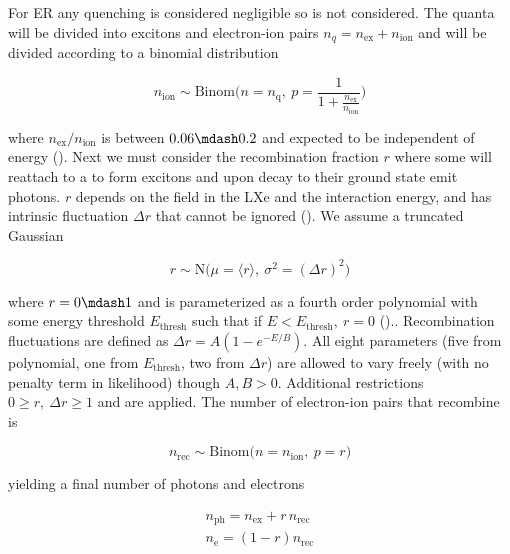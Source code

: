 For ER any quenching is considered negligible so is not considered.  The quanta will be divided into excitons and electron-ion pairs
$n_q = n_{\mathrm{ex}} + n_{\mathrm{ion}}$ and will be divided according to a binomial distribution

\begin{equation}
n_{\mathrm{ion}} \sim \mathrm{Binom} \Bigg(n = n_{\mathrm{q}},\ p = \frac{1}{1 + \frac{n_{\mathrm{ex}}}{n_{\mathrm{ion}}}} \Bigg)
\label{eq:er_nr_calibrations_parameter_determ_er_nions}
\end{equation}

\noindent where $n_{\mathrm{ex}} / n_{\mathrm{ion}}$ is between $0.06 \mdash 0.2$ and expected to be independent of energy
().  Next we must consider the recombination fraction $r$ where some \electron will reattach to a  to form
excitons and upon decay to their ground state emit photons.  $r$ depends on the field in the LXe and the interaction energy, and has
intrinsic fluctuation $\Delta r$ that cannot be ignored ().  We assume a truncated Gaussian

\begin{equation}
r \sim \mathrm{N} \Big( \mu = \langle r \rangle,\ \sigma^2 = (\Delta r)^2 \Big)
\end{equation}

\noindent where $r = 0 \mdash 1$ and is parameterized as a fourth order polynomial with some energy threshold
$E_{\mathrm{thresh}}$ such that if $E < E_{\mathrm{thresh}},\ r = 0$ ()..  Recombination fluctuations are defined as
$\Delta r = A(1 - e^{-E/B})$.  All eight parameters (five from polynomial, one from $E_{\mathrm{thresh}}$, two from $\Delta r$) are allowed
to vary freely (with no penalty term in likelihood) though $A,B > 0$.  Additional restrictions $0 \geq r,\ \Delta r \geq 1$ and
are applied.  The number of electron-ion pairs that recombine is

\begin{equation}
n_{\mathrm{rec}} \sim \mathrm{Binom} \Big(n = n_{\mathrm{ion}},\ p = r \Big)
\end{equation}

\noindent yielding a final number of photons and electrons

\begin{equation}
\begin{aligned}
n_{\mathrm{ph}} = n_{\mathrm{ex}} + r\, n_{\mathrm{rec}} \\
n_{\mathrm{e}} = (1 - r) n_{\mathrm{rec}}
\end{aligned}
\end{equation}

